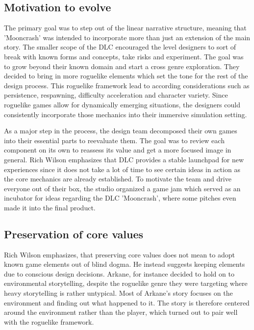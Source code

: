 \documentclass[a4paper]{article}
\begin{document}
\subsection{Motivation to evolve}
The primary goal was to step out of the linear narrative structure, meaning that 'Mooncrash' was intended to incorporate more than just an extension of the main story. The smaller scope of the DLC encouraged the level designers to sort of break with known forms and concepts, take risks and experiment. The goal was to grow beyond their known domain and start a cross genre exploration. They decided to bring in more roguelike elements which set the tone for the rest of the design process. This roguelike framework lead to according considerations such as persistence, respawning, difficulty acceleration and character variety. Since roguelike games allow for dynamically emerging situations, the designers could consistently incorporate those mechanics into their immersive simulation setting. \newline

\noindent As a major step in the process, the design team decomposed their own games into their essential parts to reevaluate them. The goal was to review each component on its own to reassess its value and get a more focused image in general. Rich Wilson emphasizes that DLC provides a stable launchpad for new experiences since it does not take a lot of time to see certain ideas in action as the core mechanics are already established. To motivate the team and drive everyone out of their box, the studio organized a game jam which served as an incubator for ideas regarding the DLC 'Mooncrash', where some pitches even made it into the final product. 

\subsection{Preservation of core values}
Rich Wilson emphasizes, that preserving core values does not mean to adopt known game elements out of blind dogma. He instead suggests keeping elements due to conscious design decisions. Arkane, for instance decided to hold on to environmental storytelling, despite the roguelike genre they were targeting where heavy storytelling is rather untypical. Most of Arkane's story focuses on the environment and finding out what happened to it. The story is therefore centered around the environment rather than the player, which turned out to pair well with the roguelike framework. \newline
\end{document}
